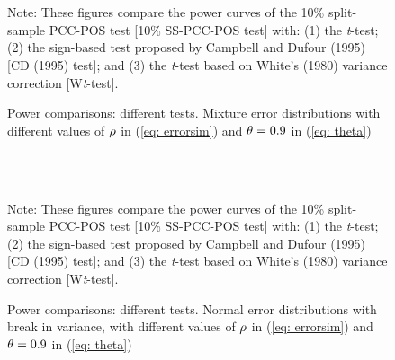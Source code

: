 \documentclass[harvard,11pt]{article}
\begin{document}
\begin{figure}[tbph]
\caption{Power comparisons: different tests. Mixture error distributions with
different values of $\protect\rho $ in (\protect\ref{eq: errorsim}) and $\protect%
\theta =0.9$ in (\protect\ref{eq: theta})}
\begin{center}
 \\[0pt]
\\[0pt]
\end{center}
\doublespacing
Note: These figures compare the power curves of the 10\% split-sample PCC-POS test
[10\% SS-PCC-POS test] with: (1) the \textit{t}-test; (2) the sign-based test
proposed by Campbell and Dufour (1995) [CD (1995) test]; and (3) the \textit{t}-test based
on White's (1980) variance correction [W\textit{t}-test].
\label{fig: Sim410}
\end{figure}


\begin{figure}[tbph]
\caption{Power comparisons: different tests. Normal error distributions with break in variance,
with different values of $\protect\rho $ in (\protect\ref{eq: errorsim}) and $\protect%
\theta =0.9$ in (\protect\ref{eq: theta})}
\begin{center}
 \\[0pt]
\\[0pt]
\end{center}
\doublespacing
Note: These figures compare the power curves of the 10\% split-sample PCC-POS test
[10\% SS-PCC-POS test] with: (1) the \textit{t}-test; (2) the sign-based test
proposed by Campbell and Dufour (1995) [CD (1995) test]; and (3) the \textit{t}-test based
on White's (1980) variance correction [W\textit{t}-test].
\label{fig: Sim511}
\end{figure}
\end{document}
